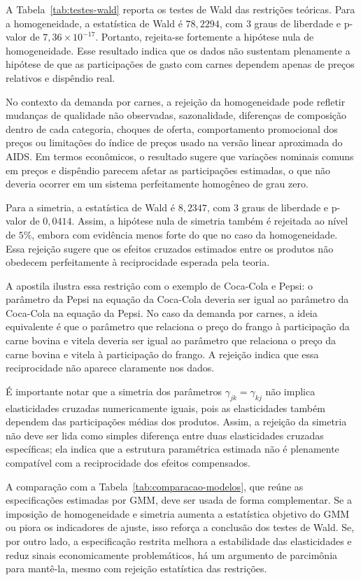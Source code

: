 A Tabela~\ref{tab:testes-wald} reporta os testes de Wald das restrições teóricas. Para a homogeneidade, a estatística de Wald é \(78{,}2294\), com \(3\) graus de liberdade e p-valor de \(7{,}36\times 10^{-17}\). Portanto, rejeita-se fortemente a hipótese nula de homogeneidade. Esse resultado indica que os dados não sustentam plenamente a hipótese de que as participações de gasto com carnes dependem apenas de preços relativos e dispêndio real.

No contexto da demanda por carnes, a rejeição da homogeneidade pode refletir mudanças de qualidade não observadas, sazonalidade, diferenças de composição dentro de cada categoria, choques de oferta, comportamento promocional dos preços ou limitações do índice de preços usado na versão linear aproximada do AIDS. Em termos econômicos, o resultado sugere que variações nominais comuns em preços e dispêndio parecem afetar as participações estimadas, o que não deveria ocorrer em um sistema perfeitamente homogêneo de grau zero.

Para a simetria, a estatística de Wald é \(8{,}2347\), com \(3\) graus de liberdade e p-valor de \(0{,}0414\). Assim, a hipótese nula de simetria também é rejeitada ao nível de \(5\%\), embora com evidência menos forte do que no caso da homogeneidade. Essa rejeição sugere que os efeitos cruzados estimados entre os produtos não obedecem perfeitamente à reciprocidade esperada pela teoria.

A apostila ilustra essa restrição com o exemplo de Coca-Cola e Pepsi: o parâmetro da Pepsi na equação da Coca-Cola deveria ser igual ao parâmetro da Coca-Cola na equação da Pepsi. No caso da demanda por carnes, a ideia equivalente é que o parâmetro que relaciona o preço do frango à participação da carne bovina e vitela deveria ser igual ao parâmetro que relaciona o preço da carne bovina e vitela à participação do frango. A rejeição indica que essa reciprocidade não aparece claramente nos dados.

É importante notar que a simetria dos parâmetros \(\gamma_{jk}=\gamma_{kj}\) não implica elasticidades cruzadas numericamente iguais, pois as elasticidades também dependem das participações médias dos produtos. Assim, a rejeição da simetria não deve ser lida como simples diferença entre duas elasticidades cruzadas específicas; ela indica que a estrutura paramétrica estimada não é plenamente compatível com a reciprocidade dos efeitos compensados.

A comparação com a Tabela~\ref{tab:comparacao-modelos}, que reúne as especificações estimadas por GMM, deve ser usada de forma complementar. Se a imposição de homogeneidade e simetria aumenta a estatística objetivo do GMM ou piora os indicadores de ajuste, isso reforça a conclusão dos testes de Wald. Se, por outro lado, a especificação restrita melhora a estabilidade das elasticidades e reduz sinais economicamente problemáticos, há um argumento de parcimônia para mantê-la, mesmo com rejeição estatística das restrições.

